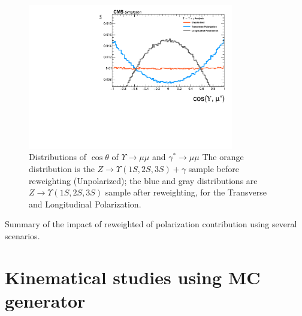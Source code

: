 \begin{figure}[!htbp]
\begin{center}
\includegraphics[width=0.80\textwidth]{figures_and_tables/outputPlots/ZtoUpsilon_Cat0_ZZZZZ/mc/polarizatioReweight/h_Gen_COS_theta_extremes}
\end{center}\vspace*{-.5cm}
\caption{Distributions of $\cos \theta$ of $\Upsilon \rightarrow \mu\mu$ and $\gamma^{*} \rightarrow \mu\mu$ The orange distribution is the $Z \rightarrow  \Upsilon(1S,2S,3S) + \gamma$ sample before reweighting (Unpolarized); the blue and gray distributions are $Z \rightarrow  \Upsilon(1S,2S,3S)$ sample after reweighting, for the Transverse and Longitudinal Polarization.}
\label{fig:ZUpsilonPolarization}
\end{figure}


\begin{table}[htp]
\begin{center}
\caption{Summary of the impact of reweighted of polarization contribution using several scenarios.}

\label{fig:polTable}
\end{center}
\end{table} 



\section{Kinematical studies using MC generator}



